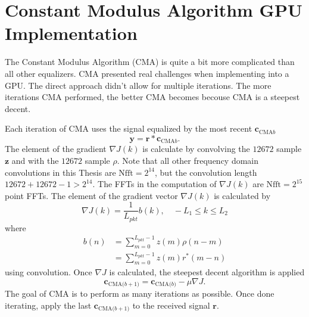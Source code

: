 \section{Constant Modulus Algorithm GPU Implementation}
The Constant Modulus Algorithm (CMA) is quite a bit more complicated than all other equalizers.
CMA presented real challenges when implementing into a GPU.
The direct approach didn't allow for multiple iterations.
The more iterations CMA performed, the better CMA becomes becouse CMA is a steepest decent.

Each iteration of CMA uses the signal equalized by the most recent $\mathbf{c}_{\text{CMA}b}$
\begin{equation}
\mathbf{y} = \mathbf{r}*\mathbf{c}_{\text{CMA}b}.
\end{equation}
The element of the gradient $\nabla J(k)$ is calculate by convolving the $12672$ sample $\mathbf{z}$ and with the $12672$ sample $\rho$. 
Note that all other frequency domain convolutions in this Thesis are $\text{Nfft} = 2^{14}$, but the convolution length $12672+12672-1>2^{14}$. The FFTs in the computation of $\nabla J(k)$ are $\text{Nfft} = 2^{15}$ point FFTs.
The element  of the gradient vector $\nabla J(k)$ is calculated by
\begin{equation}
\nabla J(k) = \frac{1}{L_{pkt}} b(k), \quad -L_1 \leq k \leq L_2
\end{equation}
where
\begin{align}
b(n) &= \sum^{L_{pkt}-1}_{m=0} z(m) \rho(n-m) \nonumber \\
	 &= \sum^{L_{pkt}-1}_{m=0} z(m) r^\ast(m-n)
\end{align}
using convolution.
Once $\nabla J$ is calculated, the steepest decent algorithm is applied
\begin{equation}
\mathbf{c}_\text{CMA($b+1$)} = \mathbf{c}_\text{CMA($b$)}-\mu \nabla J.
\end{equation}
The goal of CMA is to perform as many iterations as possible.
Once done iterating, apply the last $\mathbf{c}_\text{CMA($b+1$)}$ to the received signal $\mathbf{r}$.

